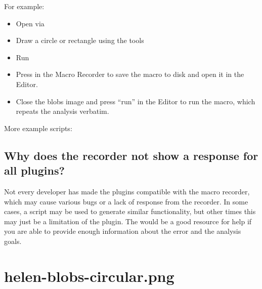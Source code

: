 \documentclass[letterpaper,10pt,english]{jupyterBook}
\begin{document}
\sphinxAtStartPar
For example:
\begin{itemize}
\item {} 
\sphinxAtStartPar
Open  via 

\item {} 
\sphinxAtStartPar
Draw a circle or rectangle using the tools

\item {} 
\sphinxAtStartPar
Run 

\end{itemize}

\sphinxAtStartPar
{}
\begin{itemize}
\item {} 
\sphinxAtStartPar
Press  in the Macro Recorder to save the macro to disk and open it in the Editor.

\item {} 
\sphinxAtStartPar
Close the blobs image and press “run” in the Editor to run the macro, which repeats the analysis verbatim.

\end{itemize}

\sphinxAtStartPar
More example scripts:\\


\subsection{Why does the recorder not show a response for all plugins?}
\label{\detokenize{basic-scripting:why-does-the-recorder-not-show-a-response-for-all-plugins}}
\sphinxAtStartPar
Not every developer has made the plugins compatible with the macro recorder, which
may cause various bugs or a lack of response from the recorder. In some cases, a script may be
used to generate similar functionality, but other times this may just be a limitation of the plugin.
The  would be a good resource for help if you are able to provide enough
information about the error and the analysis goals.


\section[]{\lowercase{\sphinxincludegraphics}{{helen-blobs-circular}.png}}
\label{\detokenize{basic-scripting:id1}}
\end{document}
